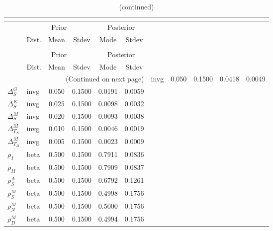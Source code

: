  
\begin{center}
\begin{longtable}{llcccc} 
\caption{Results from posterior maximization (parameters)}\\
 \label{Table:Posterior:1}\\
\toprule 
  & \multicolumn{3}{c}{Prior}  &  \multicolumn{2}{c}{Posterior} \\
  \cmidrule(r{.75em}){2-4} \cmidrule(r{.75em}){5-6}
  & Dist. & Mean  & Stdev & Mode & Stdev \\ 
\midrule \endfirsthead 
\caption{(continued)}\\
 \bottomrule 
  & \multicolumn{3}{c}{Prior}  &  \multicolumn{2}{c}{Posterior} \\
  \cmidrule(r{.75em}){2-4} \cmidrule(r{.75em}){5-6}
  & Dist. & Mean  & Stdev & Mode & Stdev \\ 
\midrule \endhead 
\bottomrule \multicolumn{6}{r}{(Continued on next page)}\endfoot 
\bottomrule\endlastfoot 
${\Delta^{A}_{S}}$ & invg &   0.050 & 0.1500 &   0.0418 &  0.0049 \\ 
${\Delta^{G}_{S}}$ & invg &   0.050 & 0.1500 &   0.0191 &  0.0059 \\ 
${\Delta^{K}_{S}}$ & invg &   0.025 & 0.1500 &   0.0098 &  0.0032 \\ 
${\Delta^{M}_{S}}$ & invg &   0.020 & 0.1500 &   0.0093 &  0.0038 \\ 
${\Delta^{M}_{T_N}}$ & invg &   0.010 & 0.1500 &   0.0046 &  0.0019 \\ 
${\Delta^{M}_{T_D}}$ & invg &   0.005 & 0.1500 &   0.0023 &  0.0009 \\ 
${\rho_{I}}$ & beta &   0.500 & 0.1500 &   0.7911 &  0.0836 \\ 
${\rho_{II}}$ & beta &   0.500 & 0.1500 &   0.7909 &  0.0837 \\ 
${\rho^{A}_{S}}$ & beta &   0.500 & 0.1500 &   0.6792 &  0.1261 \\ 
${\rho^{M}_{S}}$ & beta &   0.500 & 0.1500 &   0.4998 &  0.1756 \\ 
${\rho^{M}_{N}}$ & beta &   0.500 & 0.1500 &   0.5000 &  0.1756 \\ 
${\rho^{M}_{D}}$ & beta &   0.500 & 0.1500 &   0.4994 &  0.1756 \\ 
\end{longtable}
 \end{center}
